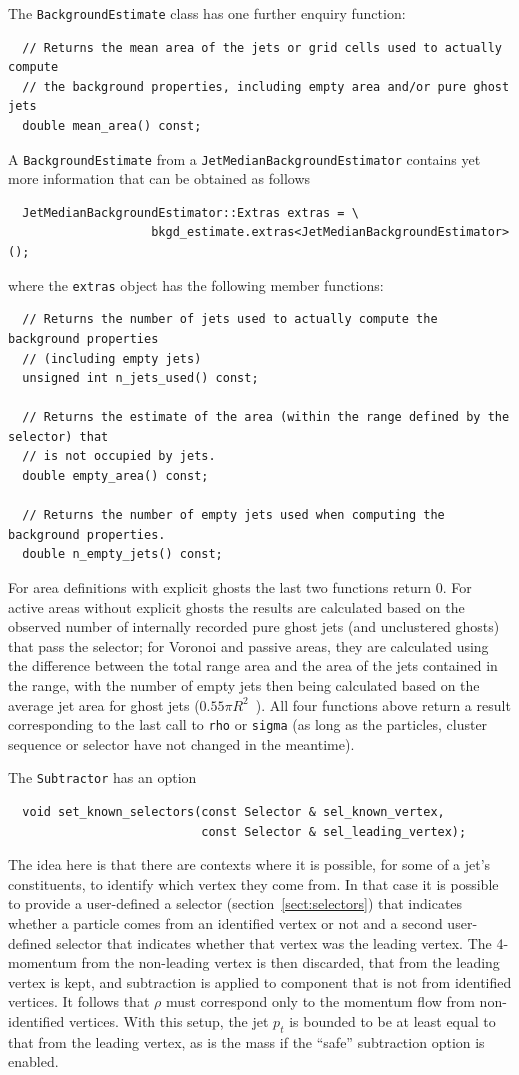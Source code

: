 \documentclass[12pt,a4]{article}
\newcommand{\ttt}[1]{{\small\texttt{#1}}}
\begin{document}
The \ttt{BackgroundEstimate} class has one further enquiry function:
\begin{lstlisting}
  // Returns the mean area of the jets or grid cells used to actually compute 
  // the background properties, including empty area and/or pure ghost jets
  double mean_area() const;
\end{lstlisting}
A \ttt{BackgroundEstimate} from a \ttt{JetMedianBackgroundEstimator} contains
yet more information that can be obtained as follows
\begin{lstlisting}
  JetMedianBackgroundEstimator::Extras extras = \
                    bkgd_estimate.extras<JetMedianBackgroundEstimator>();
\end{lstlisting}
where the \ttt{extras} object has the following member functions:
\begin{lstlisting}
  // Returns the number of jets used to actually compute the background properties
  // (including empty jets)
  unsigned int n_jets_used() const;
   
  // Returns the estimate of the area (within the range defined by the selector) that
  // is not occupied by jets.
  double empty_area() const;
   
  // Returns the number of empty jets used when computing the background properties. 
  double n_empty_jets() const;
\end{lstlisting}
For area definitions with explicit ghosts the last two functions
return $0$.
%
For active areas without explicit ghosts the results are calculated
based on the observed number of internally recorded pure ghost jets
(and unclustered ghosts) that pass the selector; for Voronoi and
passive areas, they are calculated using the difference between the
total range area and the area of the jets contained in the range, with
the number of empty jets then being calculated based on the average
jet area for ghost jets ($0.55\pi R^2$~\cite{CSSAreas}).
%
All four functions above return a result corresponding to the last call
to \ttt{rho} or \ttt{sigma} (as long as the particles, cluster sequence or
selector have not changed in the meantime).

The \ttt{Subtractor} has an option
\begin{lstlisting}
  void set_known_selectors(const Selector & sel_known_vertex,
                           const Selector & sel_leading_vertex);
\end{lstlisting}
The idea here is that there are contexts where it is possible, for
some of a jet's constituents, to identify which vertex they come from.
%
In that case it is possible to provide a user-defined a selector
(section~\ref{sect:selectors}) that indicates whether a particle comes
from an identified vertex or not and a second user-defined selector
that indicates whether that vertex was the leading vertex.
%
The 4-momentum from the non-leading vertex is then discarded, that
from the leading vertex is kept, and subtraction is applied to
component that is not from identified vertices.
%
It follows that $\rho$ must correspond only to the momentum flow from
non-identified vertices.
%
With this setup, the jet $p_t$ is bounded to be at least equal to that
from the leading vertex, as is the mass if the ``safe'' subtraction
option is enabled.
\end{document}
